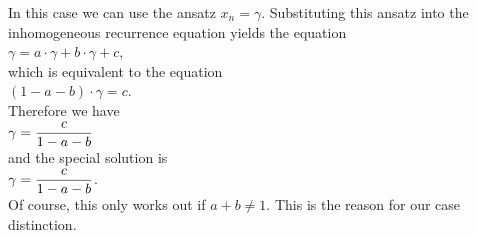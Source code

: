 \begin{enumerate}
\begin{enumerate}
            In this case we can use the ansatz $x_n = \gamma$.  Substituting this ansatz into the
            inhomogeneous recurrence equation yields the equation
            \\[0.2cm]
            \hspace*{1.3cm}
            $\gamma = a \cdot \gamma + b \cdot \gamma + c$,
            \\[0.2cm]
            which is equivalent to the equation
            \\[0.2cm]
            \hspace*{1.3cm}
            $(1 - a - b) \cdot \gamma = c$.
            \\[0.2cm]
            Therefore we have
            \\[0.2cm]
            \hspace*{1.3cm}
            $\displaystyle \gamma = \frac{c}{1 - a - b}$
            \\[0.2cm]
            and the special solution is
            \\[0.2cm]
            \hspace*{1.3cm}
            $\displaystyle \gamma = \frac{c}{1 - a - b}$.
            \\[0.2cm]
            Of course, this only works out if $a + b \not= 1$.  This is the reason for our case distinction.
            

\end{enumerate}
\end{enumerate}
